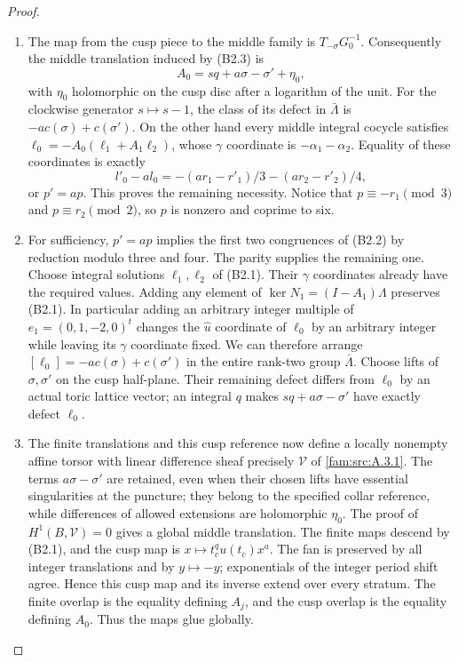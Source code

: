 \begin{proof}
\begin{enumerate}[label=\arabic*.,leftmargin=*]
\item The map from the cusp piece to the middle family is $T_{-\sigma}G_0^{-1}$. Consequently the middle translation induced by (B2.3) is
\[
 A_0=sq+a\sigma-\sigma'+\eta_0,
\]
with $\eta_0$ holomorphic on the cusp disc after a logarithm of the unit. For the clockwise generator $s\mapsto s-1$, the class of its defect in $\bar\Lambda$ is $-a c(\sigma)+c(\sigma')$. On the other hand every middle integral cocycle satisfies
$\ell_0=-A_0(\ell_1+A_1\ell_2)$, whose $\gamma$ coordinate is $-\alpha_1-\alpha_2$. Equality of these coordinates is exactly
\[
 l'_0-a l_0=-(ar_1-r'_1)/3-(ar_2-r'_2)/4,
\]
or $p'=ap$. This proves the remaining necessity. Notice that $p\equiv-r_1\pmod3$ and $p\equiv r_2\pmod2$, so $p$ is nonzero and coprime to six.

\item For sufficiency, $p'=ap$ implies the first two congruences of (B2.2) by reduction modulo three and four. The parity supplies the remaining one. Choose integral solutions $\ell_1,\ell_2$ of (B2.1). Their $\gamma$ coordinates already have the required values. Adding any element of $\ker N_1=(I-A_1)\Lambda$ preserves (B2.1). In particular adding an arbitrary integer multiple of $e_1=(0,1,-2,0)^t$ changes the $\widehat u$ coordinate of $\ell_0$ by an arbitrary integer while leaving its $\gamma$ coordinate fixed. We can therefore arrange
$[\ell_0]=-a c(\sigma)+c(\sigma')$ in the entire rank-two group $\bar\Lambda$. Choose lifts of $\sigma,\sigma'$ on the cusp half-plane. Their remaining defect differs from $\ell_0$ by an actual toric lattice vector; an integral $q$ makes $sq+a\sigma-\sigma'$ have exactly defect $\ell_0$.

\item The finite translations and this cusp reference now define a locally nonempty affine torsor with linear difference sheaf precisely $\mathcal V$ of \ref{fam:src:A.3.1}. The terms $a\sigma-\sigma'$ are retained, even when their chosen lifts have essential singularities at the puncture; they belong to the specified collar reference, while differences of allowed extensions are holomorphic $\eta_0$. The proof of $H^1(B,\mathcal V)=0$ gives a global middle translation. The finite maps descend by (B2.1), and the cusp map is $x\mapsto t_c^qu(t_c)x^a$. The fan is preserved by all integer translations and by $y\mapsto-y$; exponentials of the integer period shift agree. Hence this cusp map and its inverse extend over every stratum. The finite overlap is the equality defining $A_j$, and the cusp overlap is the equality defining $A_0$. Thus the maps glue globally.


\end{enumerate}
\end{proof}
